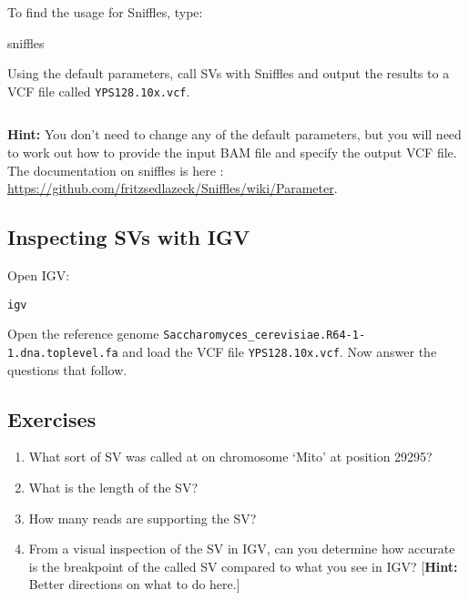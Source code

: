\documentclass[11pt]{article}
\makeatletter
\providecommand{\tightlist}{%
      \setlength{\itemsep}{0pt}\setlength{\parskip}{0pt}}
\newcommand{\boxspacing}{\kern\kvtcb@left@rule\kern\kvtcb@boxsep}
\newcommand{\prompt}[4]{
        {\ttfamily\llap{{\color{#2}[#3]:\hspace{3pt}#4}}\vspace{-\baselineskip}}
    }
\makeatother
\begin{document}
To find the usage for Sniffles, type:

    sniffles

    Using the default parameters, call SVs with Sniffles and output the
results to a VCF file called \texttt{YPS128.10x.vcf}.

    \begin{tcolorbox}[breakable, size=fbox, boxrule=1pt, pad at break*=1mm,colback=cellbackground, colframe=cellborder]
\prompt{In}{incolor}{ }{\boxspacing}
\begin{Verbatim}[commandchars=\\\{\}]

\end{Verbatim}
\end{tcolorbox}

    \textbf{Hint:} You don't need to change any of the default parameters,
but you will need to work out how to provide the input BAM file and
specify the output VCF file. The documentation on sniffles is here :
\url{https://github.com/fritzsedlazeck/Sniffles/wiki/Parameter}.

    \hypertarget{inspecting-svs-with-igv}{%
\subsection{Inspecting SVs with IGV}\label{inspecting-svs-with-igv}}

Open IGV:

    \begin{tcolorbox}[breakable, size=fbox, boxrule=1pt, pad at break*=1mm,colback=cellbackground, colframe=cellborder]
\prompt{In}{incolor}{ }{\boxspacing}
\begin{Verbatim}[commandchars=\\\{\}]
igv
\end{Verbatim}
\end{tcolorbox}

    Open the reference genome
\texttt{Saccharomyces\_cerevisiae.R64-1-1.dna.toplevel.fa} and load the
VCF file \texttt{YPS128.10x.vcf}. Now answer the questions that follow.

    \hypertarget{exercises}{%
\subsection{Exercises}\label{exercises}}

\begin{enumerate}
\def\labelenumi{\arabic{enumi}.}
\tightlist
\item
  What sort of SV was called at on chromosome `Mito' at position 29295?
\item
  What is the length of the SV?
\item
  How many reads are supporting the SV?
\item
  From a visual inspection of the SV in IGV, can you determine how
  accurate is the breakpoint of the called SV compared to what you see
  in IGV? {[}\textbf{Hint:} Better directions on what to do here.{]}
\end{enumerate}
\end{document}

